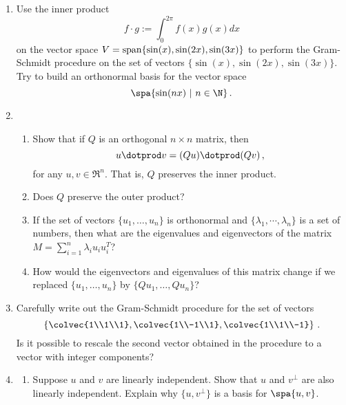 \begin{enumerate}
\item Use the inner product $$f\cdot g := \int_0^{2\pi} f(x)g(x)dx$$  on the vector space $V={\rm span} \{\sin(x),\sin(2x),\sin(3x) \}$ to perform the Gram-Schmidt procedure on the set of vectors $\{\sin(x),\sin(2x),\sin(3x) \}$. \\
Try to build an orthonormal basis for the vector space $$\spa \{ \sin(nx)~| ~n\in \N \}\, .$$
\item 
\begin{enumerate}
\item
Show that if $Q$ is an orthogonal $n\times n$ matrix, then $$u\dotprod v = (Qu)\dotprod (Qv)\, ,$$ for any $u,v\in \Re^n$. That is, $Q$ preserves the inner product. 
\item Does $Q$ preserve the outer product? 
\item  If the set of vectors $\{ u_1,\dots,u_n\}$ is orthonormal and $\{ \lambda_1,\cdots,\lambda_n\}$ is a set of numbers, 
then what are the eigenvalues and eigenvectors of the matrix
$M=\sum_{i=1}^n \lambda_i u_i u_i^T$? 
\item How would the eigenvectors and eigenvalues of this matrix change if we replaced  $\{ u_1,\dots,u_n\}$ by $\{ Qu_1,\dots,Q u_n\}$?
\end{enumerate}


\item Carefully write out the Gram-Schmidt procedure for the set of vectors 
$$\left\{ \colvec{1\\1\\1}, \colvec{1\\-1\\1}, \colvec{1\\1\\-1} \right\} \, .$$ Is it possible to rescale the second vector obtained in the procedure to a vector with integer components? 


\item 
\label{basisortho}
\begin{enumerate}
\item Suppose $u$ and $v$ are linearly independent.  Show that $u$ and $v^\perp$ are also linearly independent.  Explain why $\{u, v^\perp\}$ is a basis for $\spa \{u,v\}$.





\end{enumerate}
\end{enumerate}

